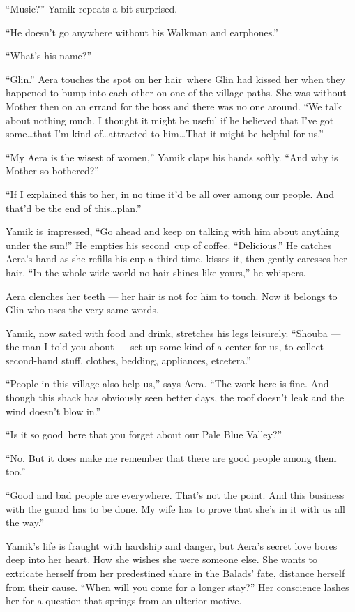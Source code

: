 \documentclass[twoside,11pt]{book}
\begin{document}
{}``Music?'' Yamik repeats a bit surprised.

``He doesn't go anywhere without his Walkman and earphones.''

{}``What's his name?''

{}``Glin.'' Aera touches the spot on her hair~where Glin had kissed her when they happened to bump into each other on
one of the village paths. She was without Mother then on an errand for the boss and there was no one around. ``We talk
about nothing much. I thought it might be useful if he believed that I've got some{\ldots}that I'm kind of{\ldots}attracted to him{\ldots}That it might be helpful for us.''

{}``My Aera is the wisest of women,'' Yamik claps his hands softly. ``And why is Mother so bothered?''

``If I explained this to her, in no time it'd be all over among our people. And that'd be the end of this{\ldots}plan.''

Yamik is~impressed, ``Go ahead and keep on talking with him about anything under the sun!'' He empties his second~cup of
coffee. ``Delicious.'' He catches Aera's hand as she refills his cup a third time, kisses it, then gently caresses
her hair. {}``In the whole wide world no hair shines like yours,{}'' he whispers.

Aera clenches her teeth --- her hair is not for him to touch. Now it belongs to Glin who uses the very same words.

Yamik, now sated with food and drink, stretches his legs leisurely. ``Shouba --- the man I told you about --- set up some
kind of a center for us, to collect second-hand stuff, clothes, bedding, appliances, etcetera.''

{}``People in this village also help us,'' says Aera. ``The work here is fine. And though this shack has obviously seen
better days, the roof doesn't leak and the wind doesn't blow in.''

{}``Is it so good~here that you forget about our Pale Blue Valley?''

{}``No. But it does make me remember that there are good people among them too.''

{}``Good and bad people are everywhere. That's not the point. And this business with the guard has to be done. My wife
has to prove that she's in it with us all the way.''

Yamik's life is fraught with hardship and danger, but Aera's secret love bores deep into her heart. How she wishes she
were someone else. She wants to extricate herself from her predestined share in the Balads{'} fate, distance herself from
their cause. ``When will you come for a longer stay?'' Her conscience lashes her for a question that springs from an
ulterior motive.
\end{document}
